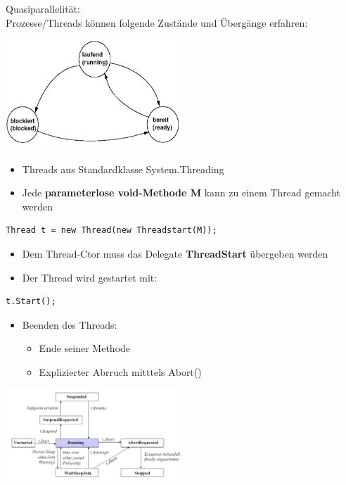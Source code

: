 Quasiparallelität:\\
Prozesse/Threads können folgende Zustände und Übergänge erfahren: 
\begin{center}
{\includegraphics[width=0.5\textwidth]{images/Concurrency/Prozesszustaende.png}}
\end{center}

\begin{itemize}
  \item Threads aus Standardklasse System.Threading
  \item Jede \textbf{parameterlose void-Methode M} kann zu einem Thread gemacht
  werden 
\end{itemize}
\begin{centering}
  \begin{lstlisting}[style=C]
  Thread t = new Thread(new Threadstart(M));
  \end{lstlisting}
\end{centering}
\begin{itemize}
  \item Dem Thread-Ctor muss das Delegate \textbf{ThreadStart} übergeben werden
  \item Der Thread wird gestartet mit:  
\end{itemize}
\begin{centering}
  \begin{lstlisting}[style=C]
  t.Start();
  \end{lstlisting}
\end{centering}
\begin{itemize}
  \item Beenden des Threads: 
  \begin{itemize}
    \item Ende seiner Methode
    \item Explizierter Abrruch mitttels Abort()  
  \end{itemize} 
\end{itemize}
\begin{center}
{\includegraphics[width=0.5\textwidth]{images/Concurrency/Zustandsuebergaenge.png}}
\end{center}

